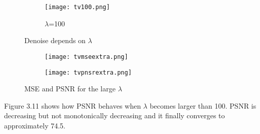 \documentclass[12pt]{report}
\begin{document}
\begin{tableofcontents}
\begin{figure}[H]
\begin{subfigure}{0.325\textwidth}
					\texttt{[image: tv100.png]}
					\caption{$\lambda$=100}
				\end{subfigure}
                \caption{Denoise depends on $\lambda$}
			\end{figure}
			\begin{figure}[H]
				\centering
				\begin{subfigure}{0.49\textwidth}
				\texttt{[image: tvmseextra.png]}
				\end{subfigure}
				\begin{subfigure}{0.49\textwidth}
				\texttt{[image: tvpnsrextra.png]}
				\end{subfigure}
				\caption{MSE and PSNR for the large $\lambda$}
			\end{figure}
\noindent
Figure 3.11 shows how PSNR behaves when $\lambda$ becomes larger than 100. PSNR is decreasing but not monotonically decreasing and it finally converges to approximately 74.5.

\end{tableofcontents}
\end{document}
